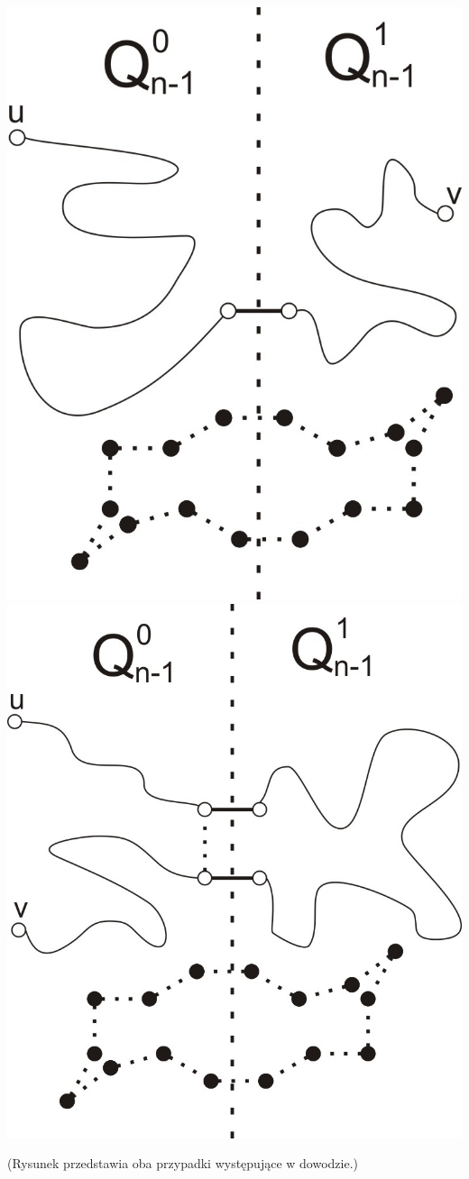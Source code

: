 \documentclass{pracamgr}
\begin{document}
    \begin{center}
     \includegraphics[scale=0.75]{img/Q_hamilton_c1.jpg}\quad\quad\quad\quad
     \includegraphics[scale=0.75]{img/Q_hamilton_c2.jpg}
    \end{center}
    (Rysunek przedstawia oba przypadki występujące w dowodzie.)\newline
\end{document}
